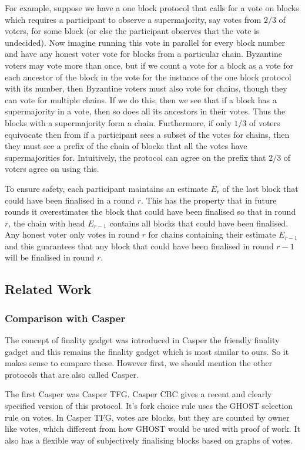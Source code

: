 \documentclass{article}
\begin{document}
For example, suppose we have a one block protocol that calls for a vote on blocks which requires a participant to observe a supermajority, say votes from  $2/3$ of voters, for some block (or else the participant observes that the vote is undecided). Now imagine running this vote in parallel for every block number and have any honest voter vote for blocks from a particular chain. Byzantine voters may vote more than once, but if we count a vote for a block as a vote for each ancestor of the block in the vote for the instance of the one block protocol with its number, then Byzantine voters must also vote for chains, though they can vote for multiple chains. If we do this, then we see that if a block has a supermajority in a vote, then so does all its ancestors in their votes. Thus the blocks with a supermajority form a chain. Furthermore, if only $1/3$ of voters equivocate then from if a participant sees a subset of the votes for chains, then they must see a prefix of the chain of blocks that all the votes have supermajorities for. Intuitively, the protocol can agree on the prefix that $2/3$ of voters agree on using this.

To ensure safety, each participant maintains an estimate $E_r$ of the last block that could have been finalised in a round $r$. This has the property that in  future rounds it overestimates the block that could have been finalised so that in round $r$, the chain with head $E_{r-1}$ contains all blocks that could have been finalised. Any honest voter only votes in round $r$ for chains containing their estimate $E_{r-1}$ and this guarantees that any block that could have been finalised in round $r-1$ will be finalised in round $r$.

\subsection{Related Work}

\subsubsection{Comparison with Casper}

The concept of finality gadget was introduced in Casper the friendly finality gadget and this remains the finality gadget which is most similar to ours. So it makes sense to compare these. However first, we should mention the other protocols that are also called Casper.

The first Casper was Casper TFG. Casper CBC\cite{CasperCBC} gives a recent and clearly specified version of this protocol. It's fork choice rule uses the GHOST selection rule on votes. In Casper TFG, votes are blocks, but they are counted by owner like votes, which different from how GHOST would be used with proof of work. It also has a flexible way of subjectively finalising blocks based on graphs of votes. 
\end{document}
